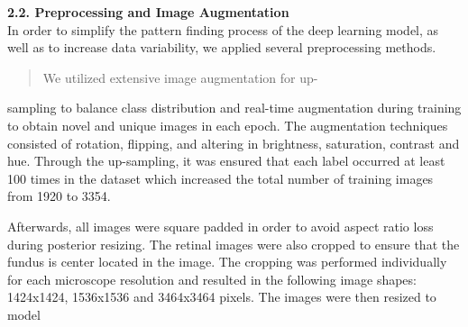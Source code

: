 \documentclass[
]{article}
\begin{document}
\textbf{2.2. Preprocessing and Image Augmentation}\\
In order to simplify the pattern finding process of the deep learning
model, as well as to increase data variability, we applied several
preprocessing methods.

\begin{quote}
We utilized extensive image augmentation for up-
\end{quote}

sampling to balance class distribution and real-time augmentation during
training to obtain novel and unique images in each epoch. The
augmentation techniques consisted of rotation, flipping, and altering in
brightness, saturation, contrast and hue. Through the up-sampling, it
was ensured that each label occurred at least 100 times in the dataset
which increased the total number of training images from 1920 to 3354.

Afterwards, all images were square padded in order to avoid aspect ratio
loss during posterior resizing. The retinal images were also cropped to
ensure that the fundus is center located in the image. The cropping was
performed individually for each microscope resolution and resulted in
the following image shapes: 1424x1424, 1536x1536 and 3464x3464 pixels.
The images were then resized to model
\end{document}
